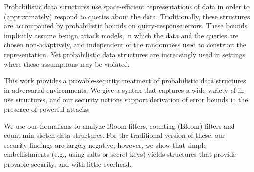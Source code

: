 Probabilistic data structures use space-efficient representations of data in
order to (approximately) respond to queries about the data.  Traditionally,
these structures are accompanied by probabilistic bounds on query-response
errors. These bounds implicitly assume benign attack models, in which the data
and the queries are chosen non-adaptively, and independent of the randomness
used to construct the representation. Yet probabilistic data structures are
increasingly used in settings where these assumptions may be violated.

This work provides a provable-security treatment of probabilistic data
structures in adversarial environments. We give a syntax that captures a wide
variety of in-use structures, and our security notions support derivation of
error bounds in the presence of powerful attacks.

We use our formalisms to analyze Bloom filters, counting (Bloom) filters and
count-min sketch data structures.  For the traditional version of these, our
security findings are largely negative; however, we show that simple
embellishments (e.g., using salts or secret keys) yields structures that
provide provable security, and with little overhead.
